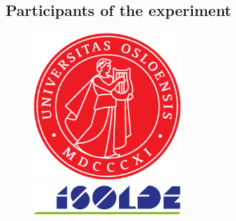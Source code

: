 \documentclass[twoside,english]{uiofysmaster/uiofysmaster}
\begin{document}
\begin{appendices}








\chapter{Participants of the experiment}

\begin{table}[ht] 
    \centering 
    \caption{}
	
	\label{tab:participants}
\end{table}

\vspace{0.5cm}

\begin{figure}[h]
	\begin{minipage}[b]{0.25\linewidth}
	\centering
		\includegraphics[width=0.5\textwidth]{uiofysmaster/figures/apollonseglet/Apollonseglet/UiO_Segl_150dpi.png}
	\end{minipage}
	\hspace{4.8cm}
	\begin{minipage}[b]{0.45\linewidth}
	\centering
		\includegraphics[width=0.5\textwidth]{Images/ISOLDE-logo.png}
	\end{minipage}
\end{figure}


\end{appendices}
\end{document}
